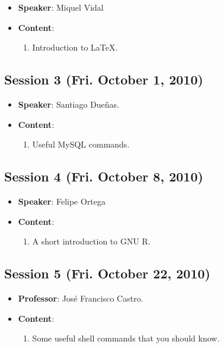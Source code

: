 \documentclass[a4paper]{article}
\begin{document}
\begin{itemize}
 \item \textbf{Speaker}: Miquel Vidal

 \item \textbf{Content}:

  \begin{enumerate}
   \item Introduction to LaTeX.
  \end{enumerate}

\end{itemize}

\subsection{Session 3 (Fri. October 1, 2010)}

  \begin{itemize}
   \item \textbf{Speaker}: Santiago Dueñas.

   \item \textbf{Content}:

   \begin{enumerate}
    \item Useful MySQL commands.
   \end{enumerate}

  \end{itemize}

\subsection{Session 4 (Fri. October 8, 2010)}

\begin{itemize}
 \item \textbf{Speaker}: Felipe Ortega

  \item \textbf{Content}:

  \begin{enumerate}
   \item A short introduction to GNU R.
  \end{enumerate}

\end{itemize}

\subsection{Session 5 (Fri. October 22, 2010)}

\begin{itemize}
 \item \textbf{Professor}: José Francisco Castro.

 \item \textbf{Content}:

 \begin{enumerate}
  \item Some useful shell commands that you should know.
 \end{enumerate}

\end{itemize}
\end{document}
